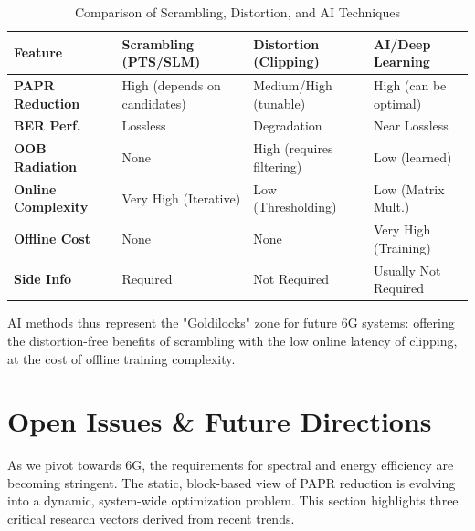 \documentclass[12pt, a4paper, onecolumn]{article}
\begin{document}
\begin{table}[htbp]
    \caption{Comparison of Scrambling, Distortion, and AI Techniques}
    \begin{center}
        \begin{tabular}{|l|p{2.5cm}|p{2.5cm}|p{2.5cm}|}
            \hline
            \textbf{Feature}           & \textbf{Scrambling (PTS/SLM)} & \textbf{Distortion (Clipping)} & \textbf{AI/Deep Learning} \\ \hline
            \textbf{PAPR Reduction}    & High (depends on candidates)  & Medium/High (tunable)          & High (can be optimal)     \\ \hline
            \textbf{BER Perf.}         & Lossless                      & Degradation                    & Near Lossless             \\ \hline
            \textbf{OOB Radiation}     & None                          & High (requires filtering)      & Low (learned)             \\ \hline
            \textbf{Online Complexity} & Very High (Iterative)         & Low (Thresholding)             & Low (Matrix Mult.)        \\ \hline
            \textbf{Offline Cost}      & None                          & None                           & Very High (Training)      \\ \hline
            \textbf{Side Info}         & Required                      & Not Required                   & Usually Not Required      \\ \hline
        \end{tabular}
        \label{tab2}
    \end{center}
\end{table}

AI methods thus represent the "Goldilocks" zone for future 6G systems: offering the distortion-free benefits of scrambling with the low online latency of clipping, at the cost of offline training complexity.

\section{Open Issues \& Future Directions}

As we pivot towards 6G, the requirements for spectral and energy efficiency are becoming stringent. The static, block-based view of PAPR reduction is evolving into a dynamic, system-wide optimization problem. This section highlights three critical research vectors derived from recent trends.
\end{document}
